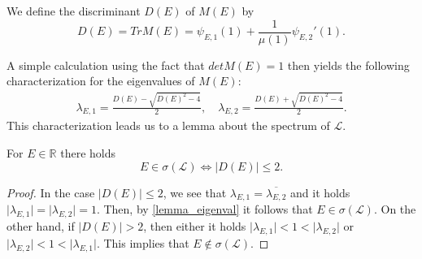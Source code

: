 \begin{defn}
    We define the discriminant $D(E)$ of $M(E)$ by
    \[ D(E) = Tr M(E) = \psi_{E,1} (1) + \frac{1}{\mu(1)} \psi_{E,2}'(1).\]
\end{defn}
A simple calculation using the fact that $det M(E) = 1$ then yields the following characterization for the eigenvalues of $M(E)$:
\begin{align}
    \lambda_{E,1} = \frac{D(E) - \sqrt{D(E)^2 -4}}{2}, \quad \lambda_{E,2} = \frac{D(E) + \sqrt{D(E)^2 -4}}{2}.
\end{align}
This characterization leads us to a lemma about the spectrum of $\mathcal{L}$.
\begin{lemma}
    For $E \in \mathbb{R}$ there holds
    \[E \in \sigma(\mathcal{L}) \iff \lvert D(E) \rvert \leq 2. \] \end{lemma}
\begin{proof}
    In the case $\lvert D(E) \rvert \leq 2$, we see that $\lambda_{E,1} = \overline{\lambda_{E,2}}$ and it holds $\lvert \lambda_{E,1}\rvert = \lvert \lambda_{E,2}\rvert=1$. Then, by \eqref{lemma_eigenval} it follows that $E \in \sigma(\mathcal{L}).$ On the other hand, if $\lvert D(E) \rvert > 2$, then either it holds $\lvert \lambda_{E,1} \rvert < 1 < \lvert \lambda_{E,2} \rvert$ or $\lvert \lambda_{E,2}\rvert < 1 < \rvert \lambda_{E,1} \rvert$. This implies that $E \notin \sigma(\mathcal{L}).$ 
\end{proof}
%
%
%
%
%
%
%
%
%
%
%
%
%
%
%
